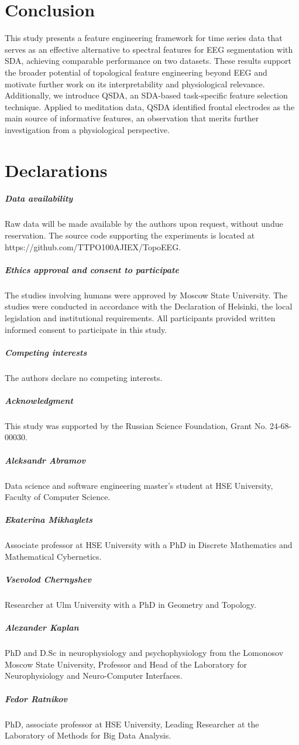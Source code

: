 \documentclass[pdflatex,sn-basic,Numbered]{sn-jnl}
\begin{document}
\section{Conclusion}

This study presents a feature engineering framework for time series data that serves as an effective alternative to spectral features for EEG segmentation with SDA, achieving comparable performance on two datasets. These results support the broader potential of topological feature engineering beyond EEG and motivate further work on its interpretability and physiological relevance. Additionally, we introduce QSDA, an SDA-based task-specific feature selection technique. Applied to meditation data, QSDA identified frontal electrodes as the main source of informative features, an observation that merits further investigation from a physiological perspective.

\section*{Declarations}

\subparagraph{\textbf{Data availability}}
Raw data will be made available by the authors upon request, without undue reservation. The source code supporting the experiments is located at https://github.com/TTPO100AJIEX/TopoEEG.

\subparagraph{\textbf{Ethics approval and consent to participate}}
The studies involving humans were approved by Moscow State University. The studies were conducted in accordance with the Declaration of Helsinki, the local legislation and institutional requirements. All participants provided written informed consent to participate in this study.

\subparagraph{\textbf{Competing interests}}
The authors declare no competing interests.

\subparagraph{\textbf{Acknowledgment}}
This study was supported by the Russian Science Foundation, Grant No. 24-68-00030.



\subparagraph{\textbf{Aleksandr Abramov}} Data science and software engineering master's student at HSE University, Faculty of Computer Science.
\subparagraph{\textbf{Ekaterina Mikhaylets}} Associate professor at HSE University with a PhD in Discrete Mathematics and Mathematical Cybernetics.
\subparagraph{\textbf{Vsevolod Chernyshev}} Researcher at Ulm University with a PhD in Geometry and Topology.
\subparagraph{\textbf{Alexander Kaplan}} PhD and D.Sc in neurophysiology and psychophysiology from the Lomonosov Moscow State University, Professor and Head of the Laboratory for Neurophysiology and Neuro-Computer Interfaces.
\subparagraph{\textbf{Fedor Ratnikov}} PhD, associate professor at HSE University, Leading Researcher at the Laboratory of Methods for Big Data Analysis.
\end{document}
